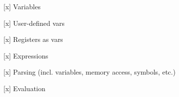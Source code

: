 \begin{DoxyItemize}
\begin{DoxyItemize}
\item \mbox{[}x\mbox{]} Variables
\begin{DoxyItemize}
\item \mbox{[}x\mbox{]} User-\/defined vars
\item \mbox{[}x\mbox{]} Registers as vars
\end{DoxyItemize}
\item \mbox{[}x\mbox{]} Expressions
\begin{DoxyItemize}
\item \mbox{[}x\mbox{]} Parsing (incl. variables, memory access, symbols, etc.)
\item \mbox{[}x\mbox{]} Evaluation 
\end{DoxyItemize}
\end{DoxyItemize}
\end{DoxyItemize}